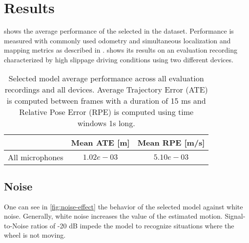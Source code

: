 \section{Results} \label{sec:results}

 shows the average performance of the
selected in the  dataset. Performance is measured
with commonly used odometry and simultaneous localization and mapping metrics
as described in \cite{Measuring2019}.  shows its results on
an evaluation recording characterized by high slippage driving conditions using
two different devices.

\begin{table}
    \centering
    \begin{tabular}{|c|c|c|}
        \hline
                        & Mean ATE [m] & Mean RPE [m/s] \\ \hline
        All microphones & $1.02e-03$   & $5.10e-03$     \\
        \hline
    \end{tabular}
    \caption[Selected model average performance across evaluation recordings
        and devices]{Selected model average performance across all evaluation
        recordings and all devices. Average Trajectory Error (ATE) is computed
        between frames with a duration of 15 ms and Relative Pose Error (RPE)
        is computed using time windows 1s long.}
    \label{table:results-selected-model}
\end{table}


\begin{figure*}
    \centering
\end{figure*}

\subsection{Noise} One can see in \cref{fig:noise-effect} the behavior of the
selected model against white noise. Generally, white noise increases the value
of the estimated motion. Signal-to-Noise ratios of -20 dB impede the model to
recognize situations where the wheel is not moving.

